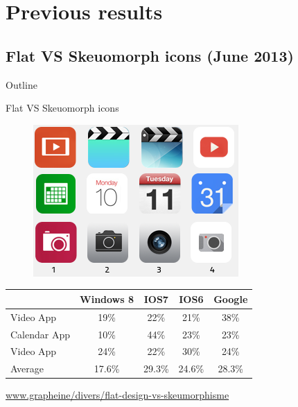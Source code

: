 \documentclass{beamer}
\begin{document}
\section{Previous results}
\subsection{Flat VS Skeuomorph icons (June 2013)}

\begin{frame}{Outline}
    \tableofcontents[currentsection]
\end{frame}

\begin{frame}{Flat VS Skeuomorph icons}
	\begin{figure}
	\centering
	\includegraphics[scale=0.5]{flat.png}
	\end{figure}
    \begin{center}
      \begin{tabular}{|l|c|c|c|c|}
        \hline
        &Windows 8 & IOS7 & IOS6 & Google\\
        \hline
        Video App 	& 19\%	& 22\%	& 21\%	& 38\% \\
        Calendar App& 10\%	& 44\%	& 23\%	& 23\% \\
        Video App	& 24\%	& 22\%	& 30\%	& 24\% \\
        \hline
        Average		& 17.6\%& 29.3\%& 24.6\%& 28.3\% \\
        \hline
      \end{tabular}
    \end{center}
    	\begin{flushright}\tiny\url{www.grapheine/divers/flat-design-vs-skeumorphisme}\normalsize\end{flushright}
\end{frame}
\end{document}
